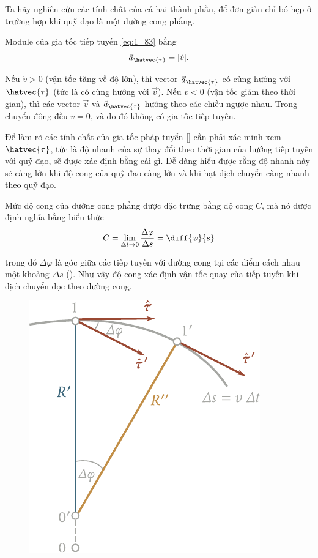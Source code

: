 Ta hãy nghiên cứu các tính chất của cả hai thành phần, để đơn giản chỉ bó hẹp ở trường hợp khi quỹ đạo là một đường cong phẳng.

Module của gia tốc tiếp tuyến \eqref{eq:1_83} bằng
\begin{equation}\label{eq:1_85}
\vec{a}_{\hatvec{\tau}} = |\dot{v}|.
\end{equation}

\noindent
Nếu $\dot{v}>0$ (vận tốc tăng về độ lớn), thì vector $\vec{a}_{\hatvec{\tau}}$ có cùng hướng với $\hatvec{\tau}$ (tức là có cùng hướng với $\vec{v}$). Nếu $\dot{v}<0$ (vận tốc giảm theo thời gian), thì các vector $\vec{v}$ và $\vec{a}_{\hatvec{\tau}}$ hướng theo các chiều ngược nhau. Trong chuyển đông đều $\dot{v}=0$, và do đó không có gia tốc tiếp tuyến.

Để làm rõ các tính chất của gia tốc pháp tuyển [] cần phải xác minh xem $\dot{\hatvec{\tau}}$, tức là độ nhanh của sự thay đổi theo thời gian của hướng tiếp tuyến với quỹ đạo, sẽ được xác định bằng cái gì. Dễ dàng hiểu được rằng độ nhanh này sẽ càng lớn khi độ cong của quỹ đạo càng lớn và khi hạt dịch chuyển càng nhanh theo quỹ đạo.

Mức độ cong của đường cong phẳng được đặc trưng bằng độ cong $C$, mà nó được định nghĩa bằng biểu thức
\begin{equation}\label{eq:1_86}
C = \lim_{\Delta t\to 0} \frac{\Delta\varphi}{\Delta s} = \diff{\varphi}{s}
\end{equation}

\noindent
trong đó $\Delta\varphi$ là góc giữa các tiếp tuyến với đường cong tại các điểm cách nhau một khoảng $\Delta s$ (). Như vậy độ cong xác định vận tốc quay của tiếp tuyến khi dịch chuyển dọc theo đường cong.

\begin{figure}[!htb]
	\begin{center}
		\includegraphics[scale=1]{figures/ch_01/fig_1_27.pdf}
		\caption[]{}
		\label{fig:1_27}
	\end{center}
\end{figure}


